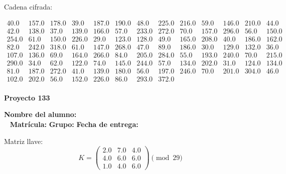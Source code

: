 \documentclass[12pt]{article}
\begin{document}
Cadena cifrada:
\begin{center}
$\begin{array}{lllllllllllll}
40.0 & 157.0 & 178.0 & 39.0 & 187.0 & 190.0 & 48.0 & 225.0 & 216.0 & 59.0 & 146.0 & 210.0 & 44.0\\
42.0 & 138.0 & 37.0 & 139.0 & 166.0 & 57.0 & 233.0 & 272.0 & 70.0 & 157.0 & 296.0 & 56.0 & 150.0\\
254.0 & 61.0 & 150.0 & 226.0 & 29.0 & 123.0 & 128.0 & 49.0 & 165.0 & 208.0 & 40.0 & 186.0 & 162.0\\
82.0 & 242.0 & 318.0 & 61.0 & 147.0 & 268.0 & 47.0 & 89.0 & 186.0 & 30.0 & 129.0 & 132.0 & 36.0\\
107.0 & 136.0 & 69.0 & 164.0 & 266.0 & 84.0 & 205.0 & 284.0 & 55.0 & 193.0 & 240.0 & 70.0 & 215.0\\
290.0 & 34.0 & 62.0 & 122.0 & 74.0 & 145.0 & 244.0 & 57.0 & 134.0 & 202.0 & 31.0 & 124.0 & 134.0\\
81.0 & 187.0 & 272.0 & 41.0 & 139.0 & 180.0 & 56.0 & 197.0 & 246.0 & 70.0 & 201.0 & 304.0 & 46.0\\
102.0 & 202.0 & 56.0 & 152.0 & 226.0 & 86.0 & 293.0 & 372.0\\
\end{array}$
\end{center}

\newpage


\textbf{Proyecto 133}

\textbf{Nombre del alumno:} \underline{\hspace{13cm}}\\\
\vspace{1cm}
\textbf{Matrícula:} \underline{\hspace{4cm}} \hspace{1cm}
\textbf{Grupo:} \underline{\hspace{2cm}}
\textbf{Fecha de entrega:} \underline{\hspace{2cm}}

\medskip

Matriz llave:
\[
K = \begin{pmatrix}
2.0 & 7.0 & 4.0\\
4.0 & 6.0 & 6.0\\
1.0 & 4.0 & 6.0
\end{pmatrix} \pmod{29}
\]
\end{document}
